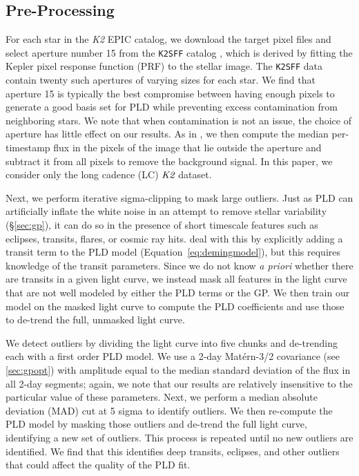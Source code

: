\documentclass[]{emulateapj}
\begin{document}
\subsection{Pre-Processing}
\label{sec:pre}
For each star in the \emph{K2} EPIC catalog, we download the target pixel files and
select aperture number 15 from the \texttt{K2SFF} catalog \citep{VJ14, VAN14}, which is derived
by fitting the Kepler pixel response function (PRF) to the stellar image. The \texttt{K2SFF}
data contain twenty such apertures of varying sizes for each star. We find that aperture 15
is typically the best compromise between having enough pixels to generate a good basis
set for PLD while preventing excess contamination from neighboring stars. We note that
when contamination is not an issue, the choice of aperture has little effect on our results.
As in \cite{VJ14}, we then compute the median per-timestamp flux in the pixels of the image 
that lie outside the aperture and subtract it from all pixels
to remove the background signal. In this paper, we consider only the long cadence (LC)
$\emph{K2}$ dataset.

Next, we perform iterative sigma-clipping to mask large outliers. Just
as PLD can artificially inflate the white noise in an attempt to remove stellar
variability (\S\ref{sec:gp}), it can do so in the presence of short timescale features
such as eclipses, transits, flares, or cosmic ray hits. \cite{DEM15} deal with this
by explicitly adding a transit term to the PLD model (Equation~\ref{eq:demingmodel}),
but this requires knowledge of the transit parameters. Since we do not
know \emph{a priori} whether there are transits in a given light curve, we instead 
mask all features in the light curve that are not well modeled by either the PLD
terms or the GP. We then train our model on the masked light curve to compute the
PLD coefficients and use those to de-trend the full, unmasked light curve.

We detect outliers by dividing the light curve into five chunks and de-trending each
with a first order PLD model. We use a 2-day Mat\'ern-3/2
covariance (see \ref{sec:gpopt}) with amplitude equal to the median standard deviation
of the flux in all 2-day segments; again, we note that our results are relatively
insensitive to the particular value of these parameters. Next, we perform a
median absolute deviation (MAD) cut at 5 sigma to identify outliers.
We then re-compute the PLD model by masking those outliers and de-trend the full
light curve, identifying a new set of outliers. This process is repeated until no new outliers
are identified. We find that this identifies deep transits, eclipses, and
other outliers that could affect the quality of the PLD fit.
\end{document}
